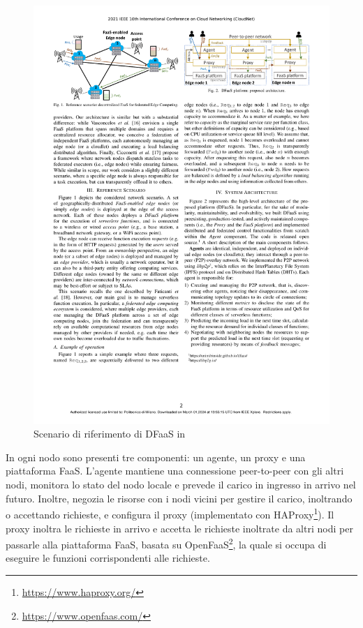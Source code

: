 \documentclass[a4paper, twocolumn]{article}
\begin{document}
\begin{figure}
    \centering
    \includegraphics[width=\columnwidth]{assets/2/dfaas_scenario.pdf}
    \caption[Scenario di riferimento di DFaaS]{Scenario di riferimento di DFaaS in \cite{Ciavotta2021}}
    \label{fig:dfaas_scenario}
\end{figure}

In ogni nodo sono presenti tre componenti: un agente, un proxy e una piattaforma FaaS. L'agente mantiene una connessione peer-to-peer con gli altri nodi, monitora lo stato del nodo locale e prevede il carico in ingresso in arrivo nel futuro. Inoltre, negozia le risorse con i nodi vicini per gestire il carico, inoltrando o accettando richieste, e configura il proxy (implementato con HAProxy\footnote{\url{https://www.haproxy.org/}}). Il proxy inoltra le richieste in arrivo e accetta le richieste inoltrate da altri nodi per passarle alla piattaforma FaaS, basata su OpenFaaS\footnote{\url{https://www.openfaas.com/}}, la quale si occupa di eseguire le funzioni corrispondenti alle richieste.
\end{document}
